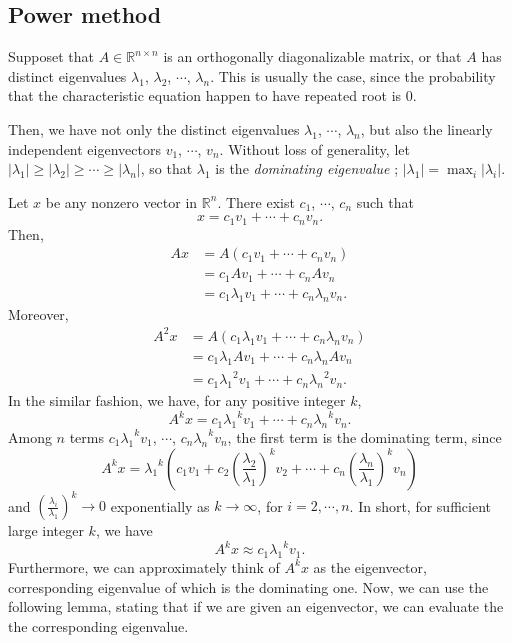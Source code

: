 \documentclass[11pt]{report}
\begin{document}
\subsection{Power method}\label{sec:power_method}
Supposet that \(A\in\mathbb R^{n\times n}\) is an orthogonally diagonalizable matrix, or that \(A\) has distinct eigenvalues \(\lambda_1\), \(\lambda_2\), \(\cdots\), \(\lambda_n\).
This is usually the case, since the probability that the characteristic equation happen to have repeated root is 0.

Then, we have not only the distinct eigenvalues \(\lambda_1\), \(\cdots\), \(\lambda_n\), but also the linearly independent eigenvectors \(v_1\), \(\cdots\), \(v_n\).
Without loss of generality, let \(|\lambda_1|\ge|\lambda_2|\ge\cdots\ge|\lambda_n|\), so that \(\lambda_1\) is the \emph{dominating eigenvalue} ; \(|\lambda_1|=\max_i|\lambda_i|\).

Let \(x\) be any nonzero vector in \(\mathbb R^n\).
There exist \(c_1\), \(\cdots\), \(c_n\) such that
\[x=c_1v_1+\cdots+c_nv_n.\]
Then,
\begin{align*}
Ax
&=A(c_1v_1+\cdots+c_nv_n)\\
&=c_1Av_1+\cdots+c_nAv_n\\
&=c_1\lambda_1v_1+\cdots+c_n\lambda_nv_n.
\end{align*}
Moreover,
\begin{align*}
A^2x
&=A(c_1\lambda_1v_1+\cdots+c_n\lambda_nv_n)\\
&=c_1\lambda_1Av_1+\cdots+c_n\lambda_nAv_n\\
&=c_1{\lambda_1}^2v_1+\cdots+c_n{\lambda_n}^2v_n.
\end{align*}
In the similar fashion, we have, for any positive integer \(k\),
\[A^kx=c_1{\lambda_1}^kv_1+\cdots+c_n{\lambda_n}^kv_n.\]
Among \(n\) terms \(c_1{\lambda_1}^kv_1\), \(\cdots\), \(c_n{\lambda_n}^kv_n\), the first term is the dominating term, since
\[A^kx={\lambda_1}^k\left(c_1v_1+c_2\left(\frac{\lambda_2}{\lambda_1}\right)^kv_2+\cdots+c_n\left(\frac{\lambda_n}{\lambda_1}\right)^kv_n\right)\]
and
\(\left(\frac{\lambda_i}{\lambda_1}\right)^k\to0\) exponentially as \(k\to\infty\), for \(i=2,\cdots,n\).
In short, for sufficient large integer \(k\), we have
\[A^kx\approx c_1{\lambda_1}^kv_1.\]
Furthermore, we can approximately think of \(A^kx\) as the eigenvector, corresponding eigenvalue of which is the dominating one.
Now, we can use the following lemma, stating that if we are given an eigenvector, we can evaluate the the corresponding eigenvalue.
\end{document}
